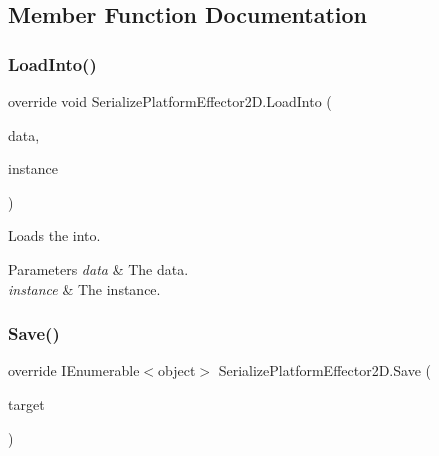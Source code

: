 \subsection{Member Function Documentation}
\mbox{\label{class_serialize_platform_effector2_d_a795aec6c3fcd799843a26c4d8f1520c8}} 
\subsubsection{\texorpdfstring{Load\+Into()}{LoadInto()}}
{\footnotesize\ttfamily override void Serialize\+Platform\+Effector2\+D.\+Load\+Into (\begin{DoxyParamCaption}\item[{object \mbox{[}$\,$\mbox{]}}]{data,  }\item[{Platform\+Effector2D}]{instance }\end{DoxyParamCaption})\hspace{0.3cm}{\ttfamily [inline]}}



Loads the into. 


\begin{DoxyParams}{Parameters}
{\em data} & The data.\\
\hline
{\em instance} & The instance.\\
\hline
\end{DoxyParams}
\mbox{\label{class_serialize_platform_effector2_d_a3cc7f3792e67702b2f2e272104353d7e}} 
\subsubsection{\texorpdfstring{Save()}{Save()}}
{\footnotesize\ttfamily override I\+Enumerable$<$object$>$ Serialize\+Platform\+Effector2\+D.\+Save (\begin{DoxyParamCaption}\item[{Platform\+Effector2D}]{target }\end{DoxyParamCaption})\hspace{0.3cm}{\ttfamily [inline]}}



